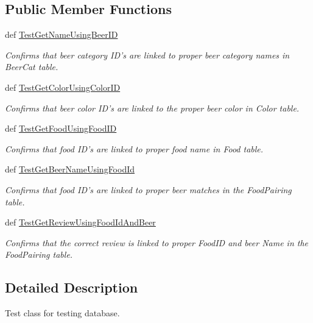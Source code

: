 \subsection*{Public Member Functions}
\begin{DoxyCompactItemize}
\item 
def \hyperlink{classdbDoxygen_1_1Test__SQL__DB_ae0d35ceea4631b889f44716107f4e52c}{Test\-Get\-Name\-Using\-Beer\-I\-D}
\begin{DoxyCompactList}\small\item\em Confirms that beer category I\-D's are linked to proper beer category names in Beer\-Cat table. \end{DoxyCompactList}\item 
def \hyperlink{classdbDoxygen_1_1Test__SQL__DB_a9f25d58b2c8ab5d6c6536a5dc7214a01}{Test\-Get\-Color\-Using\-Color\-I\-D}
\begin{DoxyCompactList}\small\item\em Confirms that beer color I\-D's are linked to the proper beer color in Color table. \end{DoxyCompactList}\item 
def \hyperlink{classdbDoxygen_1_1Test__SQL__DB_a727a9b3476f267325da6a3d3f7442dc8}{Test\-Get\-Food\-Using\-Food\-I\-D}
\begin{DoxyCompactList}\small\item\em Confirms that food I\-D's are linked to proper food name in Food table. \end{DoxyCompactList}\item 
def \hyperlink{classdbDoxygen_1_1Test__SQL__DB_a12f7edd9bde8e132987f8a095a419e9a}{Test\-Get\-Beer\-Name\-Using\-Food\-Id}
\begin{DoxyCompactList}\small\item\em Confirms that food I\-D's are linked to proper beer matches in the Food\-Pairing table. \end{DoxyCompactList}\item 
def \hyperlink{classdbDoxygen_1_1Test__SQL__DB_a0b50d1b2d1920798ec59b26a0c538a29}{Test\-Get\-Review\-Using\-Food\-Id\-And\-Beer}
\begin{DoxyCompactList}\small\item\em Confirms that the correct review is linked to proper Food\-I\-D and beer Name in the Food\-Pairing table. \end{DoxyCompactList}\end{DoxyCompactItemize}


\subsection{Detailed Description}
Test class for testing database. 

